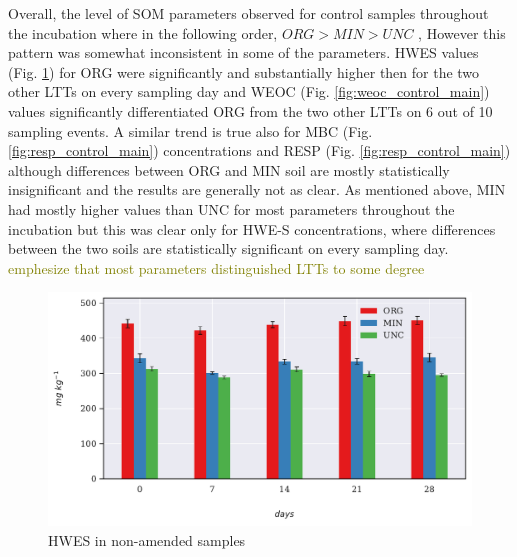 \documentclass[12pt]{report}
\newcommand{\myGreen}[1]{\textcolor{olive}{#1}} %
\begin{document}
		Overall, the level of SOM parameters observed for control samples throughout the incubation where in the following order, $ ORG  >  MIN  >  UNC $  , However this pattern was somewhat inconsistent in some of the parameters. HWES values (Fig. \ref{fig:hwes_control_main}) for ORG were significantly and substantially higher then for the two other LTTs on every sampling day and WEOC (Fig. \ref{fig:weoc_control_main}) values significantly differentiated ORG from the two other LTTs on 6 out of 10 sampling events. A similar trend is true also for MBC (Fig. \ref{fig:resp_control_main}) concentrations and RESP (Fig. \ref{fig:resp_control_main}) although differences between ORG and MIN soil  are mostly statistically insignificant and the results are generally not as clear. As mentioned above, MIN had mostly higher values than UNC for most parameters throughout the incubation but this was clear only for HWE-S concentrations, where differences between the two soils are statistically significant on every sampling day. \\
		\myGreen{emphesize that most parameters distinguished LTTs to some degree}\\
		
		\begin{figure}[H]
			\centering
			\includegraphics[scale=0.8]{thesis_figures/main_incubation/control/HWES.pdf}
			\caption{HWES in non-amended samples}
			\label{fig:hwes_control_main}
		\end{figure}
		
\end{document}
